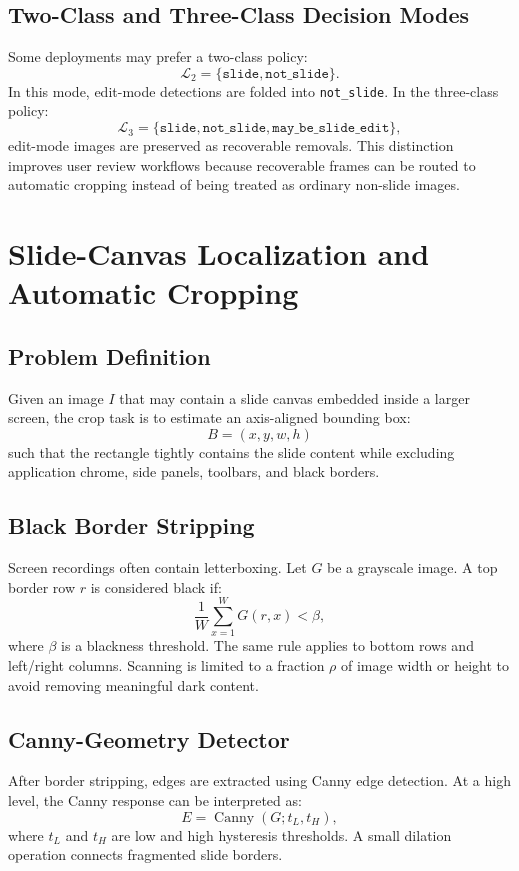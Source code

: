 \documentclass[11pt]{article}
\begin{document}
\subsection{Two-Class and Three-Class Decision Modes}

Some deployments may prefer a two-class policy:
\[
\mathcal{L}_2=\{\texttt{slide},\texttt{not\_slide}\}.
\]
In this mode, edit-mode detections are folded into \texttt{not\_slide}. In the three-class policy:
\[
\mathcal{L}_3=\{\texttt{slide},\texttt{not\_slide},\texttt{may\_be\_slide\_edit}\},
\]
edit-mode images are preserved as recoverable removals. This distinction improves user review workflows because recoverable frames can be routed to automatic cropping instead of being treated as ordinary non-slide images.

\section{Slide-Canvas Localization and Automatic Cropping}

\subsection{Problem Definition}

Given an image $I$ that may contain a slide canvas embedded inside a larger screen, the crop task is to estimate an axis-aligned bounding box:
\[
B=(x,y,w,h)
\]
such that the rectangle tightly contains the slide content while excluding application chrome, side panels, toolbars, and black borders.

\subsection{Black Border Stripping}

Screen recordings often contain letterboxing. Let $G$ be a grayscale image. A top border row $r$ is considered black if:
\[
\frac{1}{W}\sum_{x=1}^{W}G(r,x) < \beta,
\]
where $\beta$ is a blackness threshold. The same rule applies to bottom rows and left/right columns. Scanning is limited to a fraction $\rho$ of image width or height to avoid removing meaningful dark content.

\subsection{Canny-Geometry Detector}

After border stripping, edges are extracted using Canny edge detection. At a high level, the Canny response can be interpreted as:
\[
E = \operatorname{Canny}(G; t_L,t_H),
\]
where $t_L$ and $t_H$ are low and high hysteresis thresholds. A small dilation operation connects fragmented slide borders.
\end{document}

